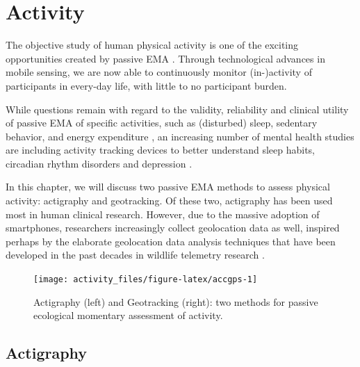\documentclass[]{book}
\begin{document}
\chapter{Activity}\label{activity}

  

The objective study of human physical activity is one of the exciting
opportunities created by passive EMA \citep{Marszalek2014}. Through
technological advances in mobile sensing, we are now able to
continuously monitor (in-)activity of participants in every-day life,
with little to no participant burden.

While questions remain with regard to the validity, reliability and
clinical utility of passive EMA of specific activities, such as
(disturbed) sleep, sedentary behavior, and energy expenditure
\citep[see, e.g.,][]{Feehan2018, Gomersall2016}, an increasing number of
mental health studies are including activity tracking devices to better
understand sleep habits, circadian rhythm disorders and depression
\citep[see, e.g.,][]{Saeb2015, Saunders2016, Tahmasian2013}.

In this chapter, we will discuss two passive EMA methods to assess
physical activity: actigraphy and geotracking. Of these two, actigraphy
has been used most in human clinical research. However, due to the
massive adoption of smartphones, researchers increasingly collect
geolocation data as well, inspired perhaps by the elaborate geolocation
data analysis techniques that have been developed in the past decades in
wildlife telemetry research \citep{tomkiewicz2010global}.

\begin{figure}

{\centering \texttt{[image: activity\_files/figure-latex/accgps-1]} 

}

\caption{Actigraphy (left) and Geotracking (right): two methods for passive ecological momentary assessment of activity.}\label{fig:accgps}
\end{figure}

\section{Actigraphy}\label{actigraphy}

  
\end{document}

